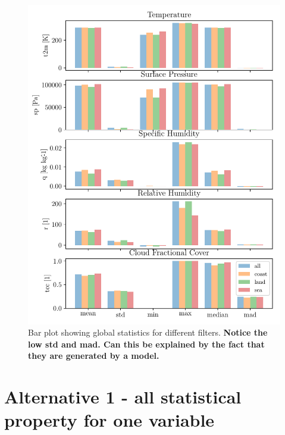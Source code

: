 \begin{figure}[ht]
    \centering
    \includegraphics{python_figs/bar_plot_global_statistics.pdf}
    \caption{Bar plot showing global statistics for different filters. \textbf{Notice the low std and mad. Can this be explained by the fact that they are generated by a model.}}
    \label{fig:bar_plot_global_stats}
\end{figure}

\section{Alternative 1 - all statistical property for one variable}

